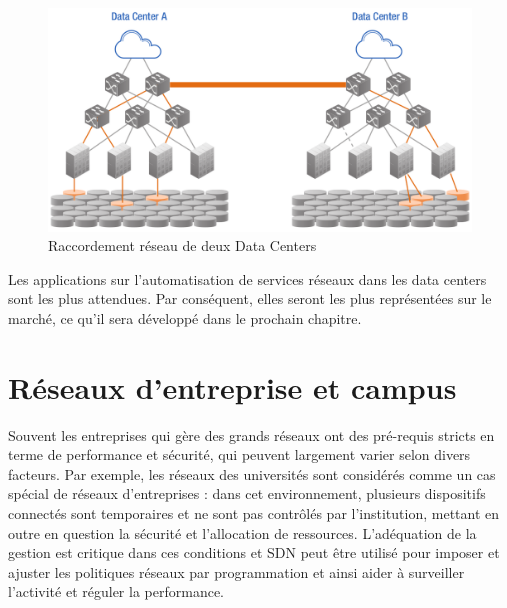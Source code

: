 \begin{figure}[!h] %
\includegraphics[width=15cm]{images/DataCenterL2Bridging.png} %
\caption{ Raccordement réseau de deux Data Centers \cite{ODCAusageScenarios}} %
\label{imgDCL2B} %
\end{figure} %

Les applications sur l'automatisation de services réseaux dans les data centers sont les plus attendues. Par conséquent,  elles seront les plus représentées sur le marché, ce qu'il sera développé dans le prochain chapitre.


\section{Réseaux d'entreprise et campus}

Souvent les entreprises qui gère des grands réseaux ont des pré-requis stricts en terme de performance et sécurité, qui peuvent largement varier selon divers facteurs. Par exemple, les réseaux des universités sont considérés comme un cas spécial de réseaux d'entreprises : dans cet environnement, plusieurs dispositifs connectés sont temporaires et ne sont pas contrôlés par l'institution, mettant en outre en question la sécurité et l'allocation de ressources. L'adéquation de la gestion est critique dans ces conditions et SDN peut être utilisé pour imposer et ajuster les politiques réseaux par programmation et ainsi aider à surveiller l'activité et réguler la performance.


